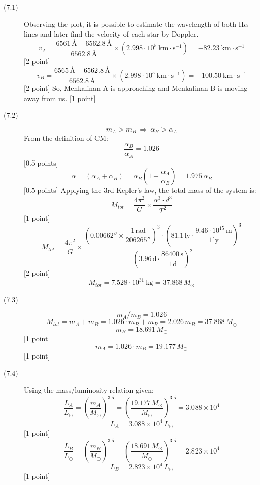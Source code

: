 \begin{description}
\item[(7.1)] Observing the plot, it is possible to estimate the wavelength of
  both H$\alpha$ lines and later find the velocity of each star by Doppler.
  \[ v_A = \frac{6561\,\text{\AA} - 6562.8\,\text{\AA}}{6562.8\,\text{\AA}}
     \times\left(2.998\cdot 10^5\ \mathrm{km\cdot s^{-1}}\right)
     = -82.23\ \mathrm{km\cdot s^{-1}} \]
  \hfill[2 point]
  \[ v_B = \frac{6565\,\text{\AA} - 6562.8\,\text{\AA}}{6562.8\,\text{\AA}}
     \times\left(2.998\cdot 10^5\ \mathrm{km\cdot s^{-1}}\right)
     = +100.50\ \mathrm{km\cdot s^{-1}} \]
  \hfill[2 point]
  So, Menkalinan A is approaching and Menkalinan B is moving away from us.
  \hfill[1 point]
\item[(7.2)]
  \[ m_A > m_B \ \Rightarrow\ \alpha_B > \alpha_A \]
  From the definition of CM:
  \[ \frac{\alpha_B}{\alpha_A} = 1.026 \]
  \hfill[0.5 points]
  \[ \alpha = (\alpha_A + \alpha_B)
     = \alpha_B\left(1 + \frac{\alpha_A}{\alpha_B}\right)
     = 1.975\,\alpha_B \]
  \hfill[0.5 points]
  Applying the 3rd Kepler's law, the total mass of the system is:
  \[ M_{tot} = \frac{4\pi^2}{G}\times\frac{\alpha^3\cdot d^3}{T^2} \]
  \hfill[1 point]
  \[ M_{tot} = \frac{4\pi^2}{G}\times
     \frac{\left(0.00662''\times\dfrac{1\,\mathrm{rad}}{206265''}\right)^3
       \cdot\left(81.1\,\mathrm{ly}\cdot
       \dfrac{9.46\cdot 10^{15}\,\mathrm{m}}{1\,\mathrm{ly}}\right)^3}
     {\left(3.96\,\mathrm{d}\cdot
       \dfrac{86400\,\mathrm{s}}{1\,\mathrm{d}}\right)^2} \]
  \hfill[2 point]
  \[ M_{tot} = 7.528\cdot 10^{31}\ \mathrm{kg} = 37.868\,M_\odot \]
\item[(7.3)]
  \[ m_A/m_B = 1.026 \]
  \[ M_{tot} = m_A + m_B = 1.026\cdot m_B + m_B = 2.026\,m_B
     = 37.868\,M_\odot \]
  \[ m_B = 18.691\,M_\odot \]
  \hfill[1 point]
  \[ m_A = 1.026\cdot m_B = 19.177\,M_\odot \]
  \hfill[1 point]
\item[(7.4)] Using the mass/luminosity relation given:
  \[ \frac{L_A}{L_\odot} = \left(\frac{m_A}{M_\odot}\right)^{3.5}
     = \left(\frac{19.177\,M_\odot}{M_\odot}\right)^{3.5}
     = 3.088\times 10^4 \]
  \[ L_A = 3.088\times 10^4\,L_\odot \]
  \hfill[1 point]
  \[ \frac{L_B}{L_\odot} = \left(\frac{m_B}{M_\odot}\right)^{3.5}
     = \left(\frac{18.691\,M_\odot}{M_\odot}\right)^{3.5}
     = 2.823\times 10^4 \]
  \[ L_B = 2.823\times 10^4\,L_\odot \]
  \hfill[1 point]
\end{description}

